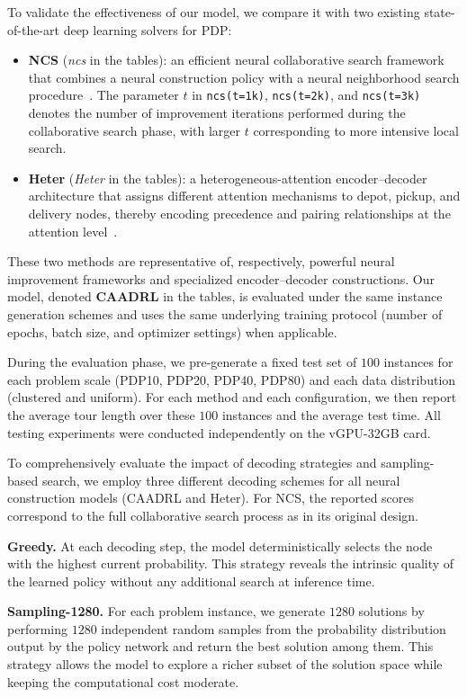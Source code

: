 \documentclass[pdflatex,sn-basic,Numbered]{sn-jnl}
\begin{document}
To validate the effectiveness of our model, we compare it with two existing state-of-the-art deep learning solvers for PDP:

\begin{itemize}
    \item \textbf{NCS} (\emph{ncs} in the tables): an efficient neural collaborative search framework that combines a neural construction policy with a neural neighborhood search procedure~\cite{kong2024ncs}. The parameter $t$ in \texttt{ncs(t=1k)}, \texttt{ncs(t=2k)}, and \texttt{ncs(t=3k)} denotes the number of improvement iterations performed during the collaborative search phase, with larger $t$ corresponding to more intensive local search.
    \item \textbf{Heter} (\emph{Heter} in the tables): a heterogeneous-attention encoder--decoder architecture that assigns different attention mechanisms to depot, pickup, and delivery nodes, thereby encoding precedence and pairing relationships at the attention level~\cite{li2022heter}.
\end{itemize}

These two methods are representative of, respectively, powerful neural improvement frameworks and specialized encoder--decoder constructions. Our model, denoted \textbf{CAADRL} in the tables, is evaluated under the same instance generation schemes and uses the same underlying training protocol (number of epochs, batch size, and optimizer settings) when applicable.

During the evaluation phase, we pre-generate a fixed test set of $100$ instances for each problem scale (PDP10, PDP20, PDP40, PDP80) and each data distribution (clustered and uniform). For each method and each configuration, we then report the average tour length over these $100$ instances and the average test time. All testing experiments were conducted independently on the vGPU-32GB card.

To comprehensively evaluate the impact of decoding strategies and sampling-based search, we employ three different decoding schemes for all neural construction models (CAADRL and Heter). For NCS, the reported scores correspond to the full collaborative search process as in its original design.

\textbf{Greedy.} At each decoding step, the model deterministically selects the node with the highest current probability. This strategy reveals the intrinsic quality of the learned policy without any additional search at inference time.

\textbf{Sampling-1280.} For each problem instance, we generate $1280$ solutions by performing $1280$ independent random samples from the probability distribution output by the policy network and return the best solution among them. This strategy allows the model to explore a richer subset of the solution space while keeping the computational cost moderate.
\end{document}
